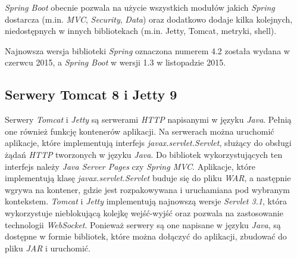 \textsl{Spring Boot} obecnie pozwala na użycie wszystkich modułów jakich \textsl{Spring} dostarcza (m.in. \textsl{MVC}, \textsl{Security}, \textsl{Data}) oraz dodatkowo dodaje kilka kolejnych, niedostępnych w innych bibliotekach (m.in. Jetty, Tomcat, metryki, shell). 

Najnowsza wersja biblioteki \textsl{Spring} oznaczona numerem 4.2 została wydana w czerwcu 2015, a \textsl{Spring Boot} w wersji 1.3 w listopadzie 2015.

\subsection{Serwery Tomcat 8 i Jetty 9} 
Serwery \textsl{Tomcat} i \textsl{Jetty} są serwerami \textsl{HTTP} napisanymi w języku \textsl{Java}. Pełnią one również funkcję kontenerów aplikacji. Na serwerach można uruchomić aplikacje, które implementują interfejs \textsl{javax.servlet.Servlet}, służący do obsługi żądań \textsl{HTTP} tworzonych w języku \textsl{Java}. Do bibliotek wykorzystujących ten interfejs należy \textsl{Java Server Pages} czy \textsl{Spring MVC}. Aplikacje, które implementują klasę \textsl{javax.servlet.Servlet} buduje się do pliku \textsl{WAR}, a następnie wgrywa na kontener, gdzie jest rozpakowywana i uruchamiana pod wybranym kontekstem. \textsl{Tomcat} i \textsl{Jetty} implementują najnowszą wersje \textsl{Servlet 3.1}, która wykorzystuje nieblokującą kolejkę wejść-wyjść oraz pozwala na zastosowanie technologii \textsl{WebSocket}. Ponieważ serwery są one napisane  w języku \textsl{Java}, są dostępne w formie bibliotek, które można dołączyć do aplikacji, zbudować do pliku \textsl{JAR} i uruchomić. 
